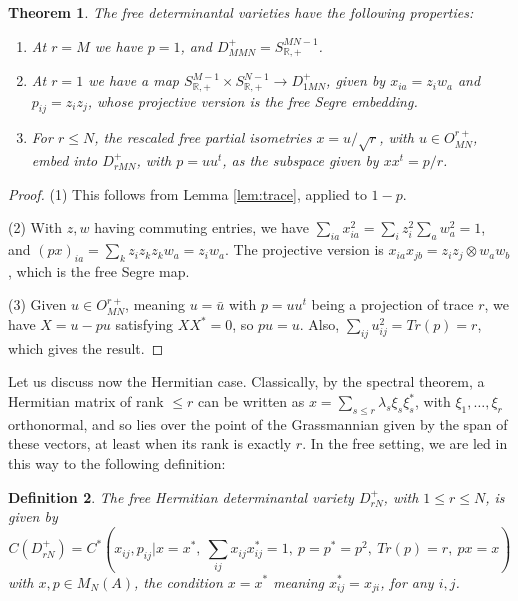 \documentclass[11pt]{article}
\theoremstyle{plain}
\newtheorem{theorem}{Theorem}[section]
\newtheorem{definition}[theorem]{Definition}
\begin{document}
\begin{theorem}
\label{thm:determinantal}
The free determinantal varieties have the following properties:
\begin{enumerate}
\item At $r=M$ we have $p=1$, and $D^+_{MMN}=S^{MN-1}_{\mathbb R,+}$.

\item At $r=1$ we have a map $S^{M-1}_{\mathbb R,+}\times S^{N-1}_{\mathbb R,+}\to D^+_{1MN}$, given by $x_{ia}=z_iw_a$ and $p_{ij}=z_iz_j$, whose projective version is the free Segre embedding.

\item For $r\leq N$, the rescaled free partial isometries $x=u/\sqrt{r}$, with $u\in O^{r+}_{MN}$, embed into $D^+_{rMN}$, with $p=uu^t$, as the subspace given by $xx^t=p/r$.
\end{enumerate}
\end{theorem}

\begin{proof}
(1) This follows from Lemma \ref{lem:trace}, applied to $1-p$.

(2) With $z,w$ having commuting entries, we have $\sum_{ia}x_{ia}^2=\sum_iz_i^2\sum_aw_a^2=1$, and $(px)_{ia}=\sum_kz_iz_kz_kw_a=z_iw_a$. The projective version is $x_{ia}x_{jb}=z_iz_j\otimes w_aw_b$, which is the free Segre map.

(3) Given $u\in O^{r+}_{MN}$, meaning $u=\bar{u}$ with $p=uu^t$ being a projection of trace $r$, we have $X=u-pu$ satisfying $XX^*=0$, so $pu=u$. Also, $\sum_{ij}u_{ij}^2=Tr(p)=r$, which gives the result.
\end{proof}

Let us discuss now the Hermitian case. Classically, by the spectral theorem, a Hermitian matrix of rank $\leq r$ can be written as $x=\sum_{s\leq r}\lambda_s\xi_s\xi_s^*$, with $\xi_1,\ldots,\xi_r$ orthonormal, and so lies over the point of the Grassmannian given by the span of these vectors, at least when its rank is exactly $r$. In the free setting, we are led in this way to the following definition:

\begin{definition}
The free Hermitian determinantal variety $D^+_{rN}$, with $1\leq r\leq N$, is given by
$$C(D^+_{rN})=C^*\left(x_{ij},p_{ij}\Big|x=x^*,\ \sum_{ij}x_{ij}x_{ij}^*=1,\ p=p^*=p^2,\ Tr(p)=r,\ px=x\right)$$
with $x,p\in M_N(A)$, the condition $x=x^*$ meaning $x_{ij}^*=x_{ji}$, for any $i,j$.
\end{definition}
\end{document}

